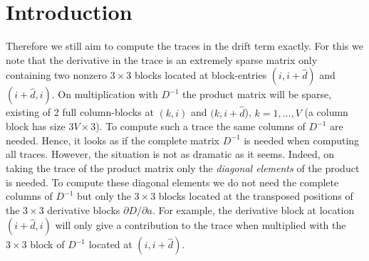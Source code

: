 \documentclass{article}
\begin{document}
\section{Introduction}
\label{Intro}

Therefore we still aim to compute the traces in the drift term exactly. For this we note that the derivative in the trace is an extremely sparse matrix only containing two nonzero $3\times 3$ blocks located at block-entries $(i,i+\hat d)$ and $(i+\hat d,i)$. On multiplication with $D^{-1}$ the product matrix will be sparse, existing of 2 full column-blocks at $(k,i)$ and $(k,i+\hat d$), $k=1,\ldots,V$ (a column block has size $3V\times 3$). To compute such a trace the same columns of $D^{-1}$ are needed. Hence, it looks as if the complete matrix $D^{-1}$ is needed when computing all traces. However, the situation is not as dramatic as it seems. Indeed, on taking the trace of the product matrix only the \textit{diagonal elements} of the product is needed. To compute these diagonal elements we do not need the complete columns of $D^{-1}$ but only the $3\times 3$ blocks located at the transposed positions of the $3\times 3$ derivative blocks $\partial D/\partial a$. For example, the derivative block at location $(i+\hat d,i)$ will only give a contribution to the trace when multiplied with the $3\times 3$ block of $D^{-1}$ located at $(i, i+\hat d)$. 
\end{document}
